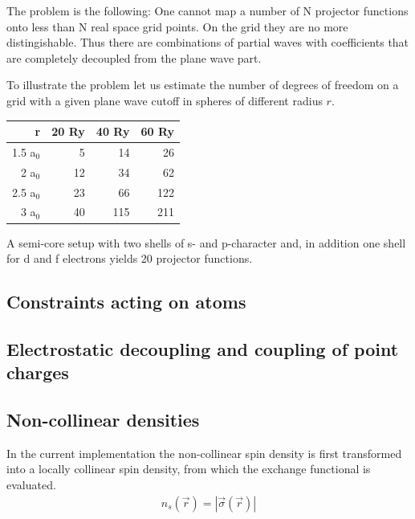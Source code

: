 \documentclass[final,12pt]{article}
\begin{document}
{{{The problem is the following: One cannot map a number of N projector
functions onto less than N real space grid points. On the grid they
are no more distingishable. Thus there are combinations of partial
waves with coefficients that are completely decoupled from the plane
wave part. 

To illustrate the problem let us estimate the number of degrees of
freedom on a grid with a given plane wave cutoff in spheres of
different radius $r$.

\begin{center}
\begin{tabular}{|r|r|r|r|}
\hline
r      & 20 Ry & 40 Ry & 60 Ry \\
\hline
1.5 a$_0$ &  5 &  14 &  26 \\
2   a$_0$& 12 &  34 &  62 \\
2.5 a$_0$& 23 &  66 &  122\\
3   a$_0$& 40 & 115 & 211 \\
\hline
\end{tabular}
\end{center}

A semi-core setup with two shells of s- and p-character and, in
addition one shell for d and f electrons yields 20 projector
functions.




\subsection{Constraints acting on atoms}


\subsection{Electrostatic decoupling and coupling of point charges}

\subsection{Non-collinear densities}
\label{sec:noncollinear}
In the current implementation the non-collinear spin density is first
transformed into a locally collinear spin density, from which the
exchange functional is evaluated. 
\begin{eqnarray*}
n_s(\vec{r})= |\vec{\sigma}(\vec{r})|
\end{eqnarray*}

}}}
\end{document}
